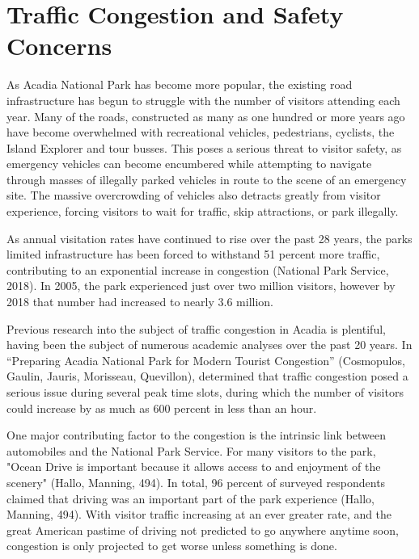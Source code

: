 \section{Traffic Congestion and Safety Concerns}
\par As Acadia National Park has become more popular, the existing road infrastructure has begun to struggle with the number of visitors attending each year. Many of the roads, constructed as many as one hundred or more years ago have become overwhelmed with recreational vehicles, pedestrians, cyclists, the Island Explorer and tour busses. This poses a serious threat to visitor safety, as emergency vehicles can become encumbered while attempting to navigate through masses of illegally parked vehicles in route to the scene of an emergency site. The massive overcrowding of vehicles also detracts greatly from visitor experience, forcing visitors to wait for traffic, skip attractions, or park illegally.

\par As annual visitation rates have continued to rise over the past 28 years, the parks limited infrastructure has been forced to withstand 51 percent more traffic, contributing to an exponential increase in congestion (National Park Service, 2018).  In 2005, the park experienced just over two million visitors, however by 2018 that number had increased to nearly 3.6 million.

\par Previous research into the subject of traffic congestion in Acadia is plentiful, having been the subject of numerous academic analyses over the past 20 years.  In “Preparing Acadia National Park for Modern Tourist Congestion” (Cosmopulos, Gaulin, Jauris, Morisseau, Quevillon), determined that traffic congestion posed a serious issue during several peak time slots, during which the number of visitors could increase by as much as 600 percent in less than an hour.

\par One major contributing factor to the congestion is the intrinsic link between automobiles and the National Park Service. For many visitors to the park, "Ocean Drive is important because it allows access to and enjoyment of the scenery" (Hallo, Manning, 494).  In total, 96 percent of surveyed respondents claimed that driving was an important part of the park experience (Hallo, Manning, 494). With visitor traffic increasing at an ever greater rate, and the great American pastime of driving not predicted to go anywhere anytime soon, congestion is only projected to get worse unless something is done.

